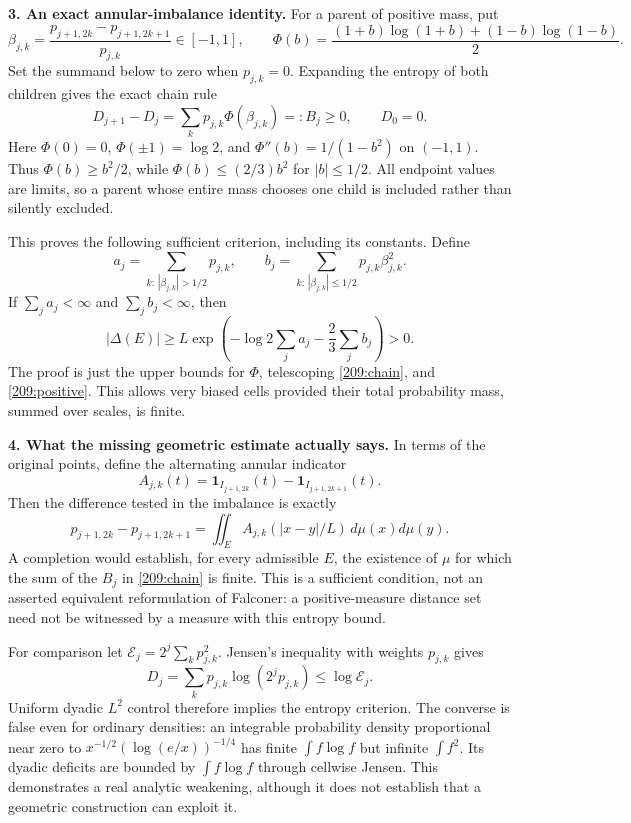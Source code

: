 \documentclass[11pt,a4paper]{article}
\begin{document}
\textbf{3. An exact annular-imbalance identity.}
For a parent of positive mass, put
\[
 \beta_{j,k}=\frac{p_{j+1,2k}-p_{j+1,2k+1}}{p_{j,k}}\in[-1,1],
 \qquad
 \Phi(b)=\frac{(1+b)\log(1+b)+(1-b)\log(1-b)}2.
\]
Set the summand below to zero when $p_{j,k}=0$. Expanding the entropy of
both children gives the exact chain rule
\begin{equation}\label{209:chain}
 D_{j+1}-D_j=\sum_k p_{j,k}\Phi(\beta_{j,k})=:B_j\ge0,
 \qquad D_0=0.
\end{equation}
Here $\Phi(0)=0$, $\Phi(\pm1)=\log2$, and
$\Phi''(b)=1/(1-b^2)$ on $(-1,1)$.
Thus $\Phi(b)\ge b^2/2$, while $\Phi(b)\le(2/3)b^2$ for $|b|\le1/2$.
All endpoint values are limits, so a parent whose entire mass chooses one
child is included rather than silently excluded.

This proves the following sufficient criterion, including its constants.
Define
\[
 a_j=\sum_{k:\,|\beta_{j,k}|>1/2}p_{j,k},\qquad
 b_j=\sum_{k:\,|\beta_{j,k}|\le1/2}p_{j,k}\beta_{j,k}^2.
\]
If $\sum_j a_j<\infty$ and $\sum_j b_j<\infty$, then
\begin{equation}\label{209:budget}
 |\Delta(E)|\ge
 L\exp\left(-\log2\sum_j a_j-\frac23\sum_j b_j\right)>0.
\end{equation}
The proof is just the upper bounds for $\Phi$, telescoping
\eqref{209:chain}, and \eqref{209:positive}. This allows very biased cells
provided their total probability mass, summed over scales, is finite.

\textbf{4. What the missing geometric estimate actually says.}
In terms of the original points, define the alternating annular indicator
\[
 A_{j,k}(t)=\mathbf1_{I_{j+1,2k}}(t)-\mathbf1_{I_{j+1,2k+1}}(t).
\]
Then the difference tested in the imbalance is exactly
\[
 p_{j+1,2k}-p_{j+1,2k+1}
   =\iint_E A_{j,k}(|x-y|/L)\,d\mu(x)d\mu(y).
\]
A completion would establish, for every admissible $E$, the existence of
$\mu$ for which the sum of the $B_j$ in \eqref{209:chain} is finite.
This is a sufficient condition, not an asserted equivalent reformulation
of Falconer: a positive-measure distance set need not be witnessed by a
measure with this entropy bound.

For comparison let $\mathcal E_j=2^j\sum_kp_{j,k}^2$. Jensen's inequality
with weights $p_{j,k}$ gives
\[
 D_j=\sum_kp_{j,k}\log(2^jp_{j,k})\le\log\mathcal E_j.
\]
Uniform dyadic $L^2$ control therefore implies the entropy criterion. The
converse is false even for ordinary densities: an integrable probability
density proportional near zero to
$x^{-1/2}(\log(e/x))^{-1/4}$ has finite $\int f\log f$ but infinite
$\int f^2$. Its dyadic deficits are bounded by $\int f\log f$ through
cellwise Jensen. This demonstrates a real analytic weakening, although
it does not establish that a geometric construction can exploit it.
\end{document}
